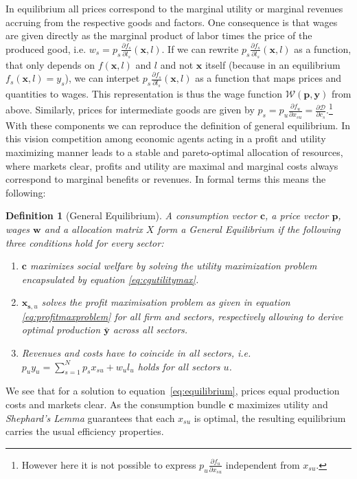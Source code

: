 \documentclass{article}
\newcommand{\prices}{\mathbf{p}}
\newcommand{\quant}{\mathbf{y}}
\newcommand{\wagef}{\mathscr{W}}
\newtheorem{definition}{Definition}
\begin{document}
In equilibrium all prices correspond to the marginal utility or marginal revenues accruing from the respective goods and factors. One consequence is that wages are given directly as the marginal product of labor times the price of the produced good, i.e. $w_{s} =  p_s \frac{\partial f_s}{\partial l_s}(\mathbf x, l) $.
If we can rewrite $ p_s \frac{\partial f_s}{\partial l_s}(\mathbf x, l) $ as a function, that only depends on $f(\mathbf x,l)$ and $l$ and not $\mathbf x$ itself (because in an equilibrium $f_s(\mathbf x,l) = y_s$), we can interpet $p_s \frac{\partial f_s}{\partial l_s}(\mathbf x, l)$ as a function that maps prices and quantities to wages.
This  representation is thus the wage function $\wagef(\prices,\quant)$ from above.
Similarly, prices for intermediate goods are given by $p_{s} =  p_u \frac{\partial f_u}{\partial x_{su}} = \frac{\partial \mathcal D}{\partial c_s}$.\footnote{However here it is not possible to express $p_u \frac{\partial f_u}{\partial x_{su}}$ independent from $x_{su}$.}
With these components we can reproduce the definition of general equilibrium. In this vision competition among economic agents acting in a profit and utility maximizing manner leads to a stable and pareto-optimal allocation of resources, where markets clear, profits and utility are maximal and marginal costs always correspond to marginal benefits or revenues.
In formal terms this means the following:

\begin{definition}[General Equilibrium]
  A consumption vector $\mathbf c$, a price vector $\mathbf p$, wages $\mathbf w $ and a allocation matrix $ X$ form a General Equilibrium if the following three conditions hold for every sector:
  \begin{enumerate}
    \item $\mathbf c$ maximizes social welfare by solving the utility maximization problem encapsulated by equation \eqref{eq:cgutilitymax}.
        \item $ \mathbf{x}_{\mathbf{s},u }$ solves the profit maximisation problem as given in equation \eqref{eq:profitmaxproblem} for all firm and sectors, respectively allowing to derive optimal production $\bar {\mathbf{y}}$ across all sectors. 
    \item  Revenues and costs have to coincide in all sectors, i.e. 
$ p_u y_u = \sum_{s=1}^N p_s x_{su} +  w_u l_u$ holds for all sectors $u$.
  \end{enumerate}
\end{definition}
We see that for a solution to equation~\eqref{eq:equilibrium}, prices equal production costs and markets clear. As the consumption bundle $\mathbf c$ maximizes utility and \textit{Shephard's Lemma} guarantees that each $x_{su}$ is optimal, the resulting equilibrium carries the usual efficiency properties.
\end{document}
